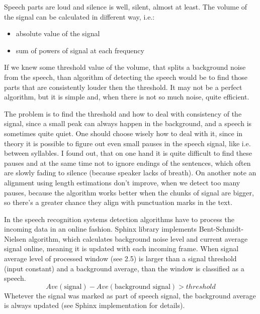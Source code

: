 \documentclass[12pt,a4paper,english]{article}
\begin{document}
Speech parts are loud and silence is well, silent, almost at least. The volume of the signal can be calculated in different way, i.e.:
\begin{itemize}
    \item absolute value of the signal
    \item sum of powers of signal at each frequency
\end{itemize}
If we knew some threshold value of the volume, that splits a background noise from the speech, than algorithm of detecting the speech would be to find those parts that are consistently louder then the threshold. It may not be a perfect algorithm, but it is simple and, when there is not so much noise, quite efficient.

\newpage

The problem is to find the threshold and how to deal with consistency of the signal, since a small peak can always happen in the background, and a speech is sometimes quite quiet. \newline
One should choose wisely how to deal with it, since in theory it is possible to figure out even small pauses in the speech signal, like i.e. between syllables.
I found out, that on one hand it is quite difficult to find these pauses and at the same time not to ignore endings of the sentences, which often are slowly fading to silence (because speaker lacks of breath). On another note an alignment using length estimations don't improve, when we detect too many pauses,
because the algorithm works better when the chunks of signal are bigger, so there's a greater chance they align with punctuation marks in the text. \newline

In the speech recognition systems detection algorithms have to process the incoming data in an online fashion. Sphinx library implements Bent-Schmidt-Nielsen algorithm, which calculates background noise level and current average signal online, meaning it is updated with each incoming frame. \newline
When signal average level of processed window (see 2.5) is larger than a signal threshold (input constant) and a background average, than the window is classified as a speech. \newline
\begin{equation}
    Ave(\text{signal}) - Ave(\text{background signal}) > threshold
\end{equation}
Whetever the signal was marked as part of speech signal, the background average is always updated (see Sphinx implementation for details). \newline
\end{document}
